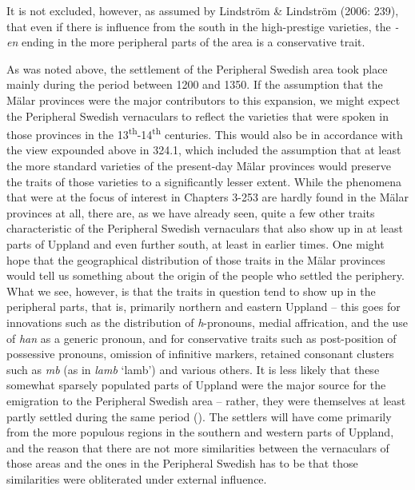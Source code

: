 \begin{styleBodytextC}
It is not excluded, however, as assumed by Lindström \& Lindström (2006: 239), that even if there is influence from the south in the high-prestige varieties, the\textit{ -}\textit{en} ending in the more peripheral parts of the area is a conservative trait.

\end{styleBodytextC}

\begin{styleBodytextC}
As was noted above, the settlement of the Peripheral Swedish area took place mainly during the period between 1200 and 1350. If the assumption that the Mälar provinces were the major contributors to this expansion, we might expect the Peripheral Swedish vernaculars to reflect the varieties that were spoken in those provinces in the 13\textsuperscript{th}{}-14\textsuperscript{th} centuries. This would also be in accordance with the view expounded above in 324.1, which included the assumption that at least the more standard varieties of the present-day Mälar provinces would preserve the traits of those varieties to a significantly lesser extent. While the phenomena that were at the focus of interest in Chapters 3{}-253 are hardly found in the Mälar provinces at all, there are, as we have already seen, quite a few other traits characteristic of the Peripheral Swedish vernaculars that also show up in at least parts of Uppland and even further south, at least in earlier times. One might hope that the geographical distribution of those traits in the Mälar provinces would tell us something about the origin of the people who settled the periphery. What we see, however, is that the traits in question tend to show up in the peripheral parts, that is, primarily northern and eastern Uppland – this goes for innovations such as the distribution of \textit{h}{}-pronouns, medial affrication, and the use of \textit{han} as a generic pronoun, and for conservative traits such as post-position of possessive pronouns, omission of infinitive markers, retained consonant clusters such as \textit{mb }(as in\textit{ lamb} ‘lamb’)\textit{ }and various others. It is less likely that these somewhat sparsely populated parts of Uppland were the major source for the emigration to the Peripheral Swedish area – rather, they were themselves at least partly settled during the same period (\citet{Broberg1990}). The settlers will have come primarily from the more populous regions in the southern and western parts of Uppland, and the reason that there are not more similarities between the vernaculars of those areas and the ones in the Peripheral Swedish has to be that those similarities were obliterated under external influence. 

\end{styleBodytextC}

